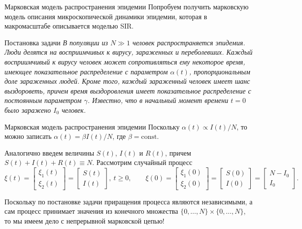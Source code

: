 \documentclass[aspectratio=169]{beamer}
\begin{document}
\begin{frame}{Марковская модель распространения эпидемии}
    Попробуем получить марковскую модель описания микроскопической динамики эпидемии, которая в макромасштабе описывается моделью SIR.
    \begin{block}{Постановка задачи}
        \emph{В популяции из $N \gg 1$ человек распространяется эпидемия. Люди делятся на восприимчивых к вирусу, зараженных и переболевших. Каждый восприимчивый к вирусу человек может сопротивляться ему некоторое время, имеющее показательное распределение с параметром $\alpha(t)$, пропорциональным доле зараженных людей. Кроме того, каждый зараженный человек имеет шанс выздороветь, причем время выздоровления имеет показательное распределение с постоянным параметром $\gamma$. Известно, что в начальный момент времени $t=0$ было заражено $I_0$ человек.}
    \end{block}
\end{frame}
\begin{frame}{Марковская модель распространения эпидемии}
    Поскольку $\alpha(t) \propto I(t)/N$, то можно записать $\alpha(t) = \beta I(t)/N$, где $\beta = \mathrm{const}$.

    Аналогично введем величины $S(t)$, $I(t)$ и $R(t)$, причем $S(t) + I(t) + R(t) \equiv N$. Рассмотрим случайный процесс
    \[ \xi(t) = \begin{bmatrix} \xi_1(t) \\ \xi_2(t) \end{bmatrix} = \begin{bmatrix} S(t) \\ I(t) \end{bmatrix}, \ t \geqslant 0, \qquad \xi(0) = \begin{bmatrix} \xi_1(0) \\ \xi_2(0) \end{bmatrix} = \begin{bmatrix} S(0) \\ I(0) \end{bmatrix} = \begin{bmatrix} N - I_0 \\ I_0 \end{bmatrix}. \]
    
    Поскольку по постановке задачи приращения процесса являются независимыми, а сам процесс принимает значения из конечного множества $\{ 0, \ldots, N \} \times \{ 0, \ldots, N \}$, то мы имеем дело с непрерывной марковской цепью!
\end{frame}
\end{document}
